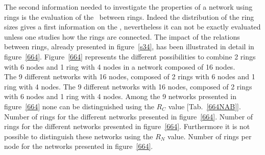 The second information needed to investigate the properties of a network using rings is the evaluation of the \con\ between rings. 
Indeed the distribution of the ring sizes gives a first information on the \con, nevertheless it can not be exactly evaluated unless one studies how the rings are connected. 
The impact of the relations between rings, already presented in figure~\ref{s34}, has been illustrated in detail in figure~\ref{664}. 
Figure~\ref{664} represents the different possibilities to combine 2 rings with 6 nodes and 1 ring with 4 nodes in a network composed of 16 nodes. \\ 
{The 9 different networks with 16 nodes, composed of 2 rings with 6 nodes and 1 ring with 4 nodes.}
{The 9 different networks with 16 nodes, composed of 2 rings with 6 nodes and 1 ring with 4 nodes.}
\laf Among the 9 networks presented in figure~\ref{664} none can be distinguished using the $R_C$ value [Tab.~\ref{664NAB}].
\newpage
{}
{Number of rings for the different networks presented in figure~\ref{664}.}
{Number of rings for the different networks presented in figure~\ref{664}.}
\noindent Furthermore it is not possible to distinguish these networks using the $R_N$ value. 
{Number of rings per node for the networks presented in figure~\ref{664}.}
